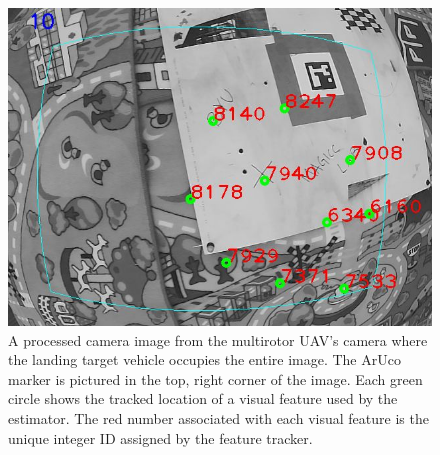 \begin{figure}
  \centering
  \includegraphics[scale=0.5]{imgs/features_with_aruco.png}
  \caption[Visual Feature Tracking During Flight Experiment]{A processed camera
    image from the multirotor UAV's camera where the landing target vehicle
    occupies the entire image. The ArUco
  marker is pictured in the top, right corner of the image. Each green
circle shows the tracked location of a visual feature used by the
estimator. The red number associated with each visual feature is the unique
integer ID assigned by the feature tracker.}
  \label{fig:features_with_aruco}
\end{figure}
